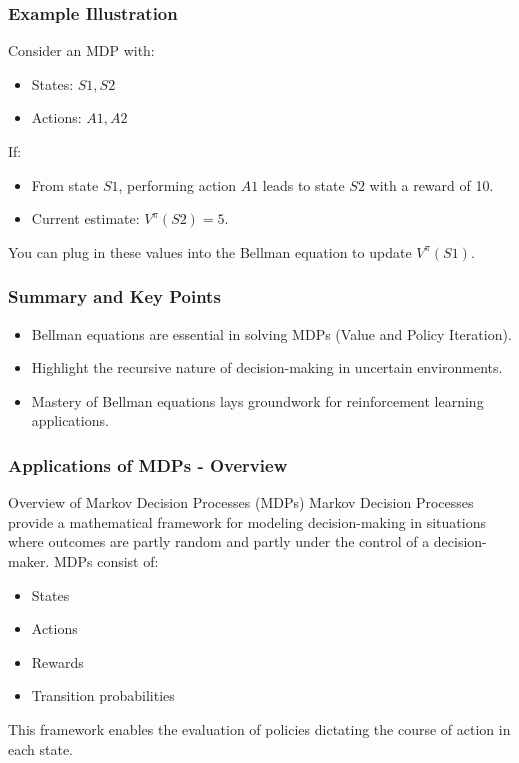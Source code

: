 \documentclass{beamer}
\begin{document}
\begin{frame}[fragile]
    \frametitle{Example Illustration}
    Consider an MDP with:
    \begin{itemize}
        \item States: \( S1, S2 \)
        \item Actions: \( A1, A2 \)
    \end{itemize}
    If:
    \begin{itemize}
        \item From state \( S1 \), performing action \( A1 \) leads to state \( S2 \) with a reward of 10.
        \item Current estimate: \( V^\pi(S2) = 5 \).
    \end{itemize}
    You can plug in these values into the Bellman equation to update \( V^\pi(S1) \).

\end{frame}

\begin{frame}[fragile]
    \frametitle{Summary and Key Points}
    \begin{itemize}
        \item Bellman equations are essential in solving MDPs (Value and Policy Iteration).
        \item Highlight the recursive nature of decision-making in uncertain environments.
        \item Mastery of Bellman equations lays groundwork for reinforcement learning applications.
    \end{itemize}
\end{frame}

\begin{frame}[fragile]
    \frametitle{Applications of MDPs - Overview}
    \begin{block}{Overview of Markov Decision Processes (MDPs)}
        Markov Decision Processes provide a mathematical framework for modeling decision-making in situations where outcomes are partly random and partly under the control of a decision-maker. MDPs consist of:
        \begin{itemize}
            \item States
            \item Actions
            \item Rewards
            \item Transition probabilities
        \end{itemize}
        This framework enables the evaluation of policies dictating the course of action in each state.
    \end{block}
\end{frame}
\end{document}
